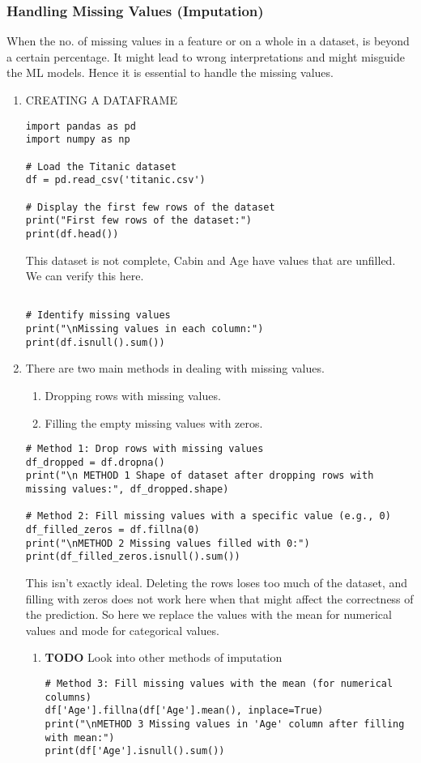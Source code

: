 \documentclass[11pt]{article}
\begin{document}
\subsubsection{Handling Missing Values (Imputation)}
\label{sec:org4aa1fc9}
When the no. of missing values in a feature or on a whole in a dataset, is beyond a certain percentage. It might lead to wrong interpretations and might misguide the ML models.
Hence it is essential to handle the missing values.
\begin{enumerate}
\item CREATING A DATAFRAME
\label{sec:orgeb7cdbf}
\begin{verbatim}
import pandas as pd
import numpy as np

# Load the Titanic dataset
df = pd.read_csv('titanic.csv')

# Display the first few rows of the dataset
print("First few rows of the dataset:")
print(df.head())
\end{verbatim}

This dataset is not complete, Cabin and Age have values that are unfilled. We can verify this here.
\begin{verbatim}

# Identify missing values
print("\nMissing values in each column:")
print(df.isnull().sum())

\end{verbatim}
\item There are two main methods in dealing with missing values.
\label{sec:org5e53646}
\begin{enumerate}
\item Dropping rows with missing values.
\item Filling the empty missing values with zeros.
\end{enumerate}
\begin{verbatim}
# Method 1: Drop rows with missing values
df_dropped = df.dropna()
print("\n METHOD 1 Shape of dataset after dropping rows with missing values:", df_dropped.shape)

# Method 2: Fill missing values with a specific value (e.g., 0)
df_filled_zeros = df.fillna(0)
print("\nMETHOD 2 Missing values filled with 0:")
print(df_filled_zeros.isnull().sum())

\end{verbatim}

This isn't exactly ideal. Deleting the rows loses too  much of the dataset, and filling with zeros does not work here when that might affect the correctness of the prediction.
So here we replace the values with the mean for numerical values and mode for categorical values.
\begin{enumerate}
\item {\bfseries\sffamily TODO} Look into other methods of imputation
\label{sec:orga110bf5}
\begin{verbatim}
# Method 3: Fill missing values with the mean (for numerical columns)
df['Age'].fillna(df['Age'].mean(), inplace=True)
print("\nMETHOD 3 Missing values in 'Age' column after filling with mean:")
print(df['Age'].isnull().sum())


\end{verbatim}
\end{enumerate}
\end{enumerate}
\end{document}
